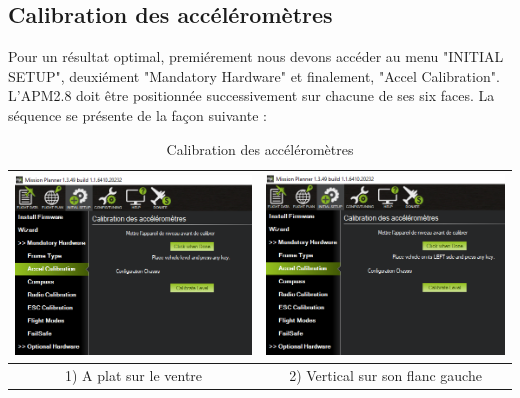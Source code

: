 	\subsection{Calibration des accéléromètres}
	Pour un résultat optimal,  premiérement nous devons accéder au menu "INITIAL SETUP", deuxiément "Mandatory Hardware" et finalement, "Accel Calibration". L'APM2.8 doit être positionnée successivement sur chacune de ses six faces.
	La séquence se présente de la façon suivante :
	\begin{table}[H]
		\begin{center}
			\caption{Calibration des accéléromètres  }
			
			\hspace*{-0.8 cm}	\begin{tabular}{|c|c|}
				\hline
				\centering
				\includegraphics[width=7.5cm]{Images/A plat sur le ventre} & \includegraphics[width=7.5cm]{Images/Vertical sur son flanc gauche}\\
				\hline
				\centering
				
				1) A plat sur le ventre & 2) Vertical sur son flanc gauche \\
				
				\hline
				

\end{tabular}
\end{center}
\end{table}
